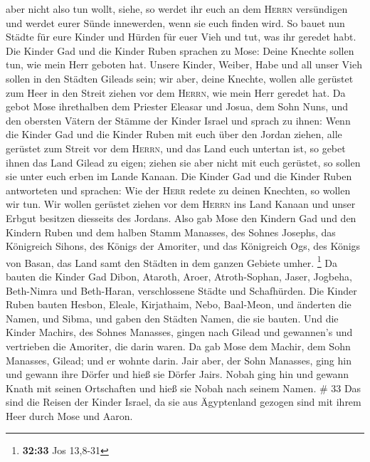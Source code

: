 aber nicht also tun wollt, siehe, so werdet ihr euch an dem
\textsc{Herrn} versündigen und werdet eurer Sünde innewerden, wenn sie
euch finden wird.  So bauet nun Städte für eure Kinder
und Hürden für euer Vieh und tut, was ihr geredet habt. 
Die Kinder Gad und die Kinder Ruben sprachen zu Mose: Deine Knechte
sollen tun, wie mein Herr geboten hat.  Unsere Kinder,
Weiber, Habe und all unser Vieh sollen in den Städten Gileads sein;
 wir aber, deine Knechte, wollen alle gerüstet zum Heer
in den Streit ziehen vor dem \textsc{Herrn}, wie mein Herr geredet hat.
 Da gebot Mose ihrethalben dem Priester Eleasar und
Josua, dem Sohn Nuns, und den obersten Vätern der Stämme der Kinder
Israel  und sprach zu ihnen: Wenn die Kinder Gad und die
Kinder Ruben mit euch über den Jordan ziehen, alle gerüstet zum Streit
vor dem \textsc{Herrn}, und das Land euch untertan ist, so gebet ihnen
das Land Gilead zu eigen;  ziehen sie aber nicht mit euch
gerüstet, so sollen sie unter euch erben im Lande Kanaan.
 Die Kinder Gad und die Kinder Ruben antworteten und
sprachen: Wie der \textsc{Herr} redete zu deinen Knechten, so wollen wir
tun.  Wir wollen gerüstet ziehen vor dem \textsc{Herrn}
ins Land Kanaan und unser Erbgut besitzen diesseits des Jordans.
 Also gab Mose den Kindern Gad und den Kindern Ruben und
dem halben Stamm Manasses, des Sohnes Josephs, das Königreich Sihons,
des Königs der Amoriter, und das Königreich Ogs, des Königs von Basan,
das Land samt den Städten in dem ganzen Gebiete umher. \footnote{\textbf{32:33}
  Jos 13,8-31}  Da bauten die Kinder Gad Dibon, Ataroth,
Aroer,  Atroth-Sophan, Jaser, Jogbeha, 
Beth-Nimra und Beth-Haran, verschlossene Städte und Schafhürden.
 Die Kinder Ruben bauten Hesbon, Eleale, Kirjathaim,
 Nebo, Baal-Meon, und änderten die Namen, und Sibma, und
gaben den Städten Namen, die sie bauten.  Und die Kinder
Machirs, des Sohnes Manasses, gingen nach Gilead und gewannen's und
vertrieben die Amoriter, die darin waren.  Da gab Mose
dem Machir, dem Sohn Manasses, Gilead; und er wohnte darin.
 Jair aber, der Sohn Manasses, ging hin und gewann ihre
Dörfer und hieß sie Dörfer Jairs.  Nobah ging hin und
gewann Knath mit seinen Ortschaften und hieß sie Nobah nach seinem
Namen. \# 33  Das sind die Reisen der Kinder Israel, da
sie aus Ägyptenland gezogen sind mit ihrem Heer durch Mose und Aaron.
